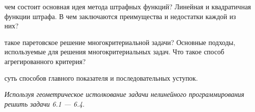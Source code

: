{\begin{enumerate}
 чем состоит основная идея метода штрафных функций? Линейная и квадратичная функции штрафа. В чем заключаются преимущества и недостатки каждой из них?

 такое паретовское решение многокритериальной задачи? Основные подходы, используемые для решения многокритериальных задач. Что такое способ агрегированного критерия?

 суть способов главного показателя и последовательных уступок.
\end{enumerate}
\newpage
\textit{Используя геометрическое истолкование задачи нелинейного программирования решить задачи 6.1 — 6.4.}
\\
\\
\begin{minipage}{0.4\textwidth}

\end{minipage}
\hfill
\begin{minipage}{0.45\textwidth}

\end{minipage}
\\
\\
\\
\begin{minipage}{0.4\textwidth}


\end{minipage}}
